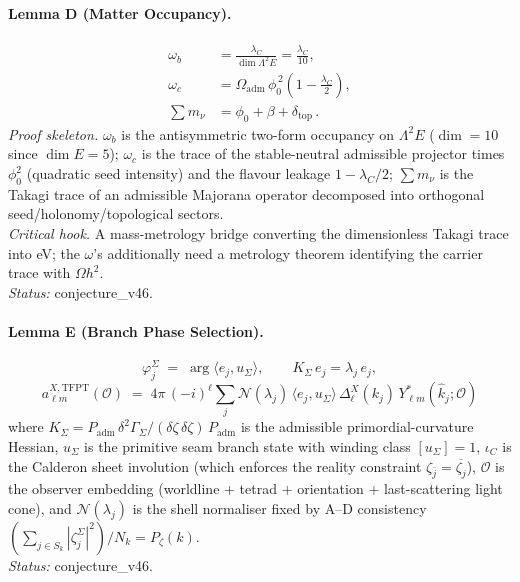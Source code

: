 \paragraph{Lemma D (Matter Occupancy).}
\begin{align}
\omega_b &= \frac{\lambda_C}{\dim \Lambda^2 E} = \frac{\lambda_C}{10},
\nonumber\\
\omega_c &= \Omega_{\mathrm{adm}}\,\phi_0^{\,2}\!\left(1-\frac{\lambda_C}{2}\right),
\nonumber\\
\sum m_\nu &= \phi_0 + \beta + \delta_{\mathrm{top}} \,.
\label{eq:lemmaD}
\end{align}
\emph{Proof skeleton.} \(\omega_b\) is the antisymmetric two-form
occupancy on \(\Lambda^2 E\) (\(\dim=10\) since \(\dim E=5\));
\(\omega_c\) is the trace of the stable-neutral admissible projector
times \(\phi_0^2\) (quadratic seed intensity) and the flavour leakage
\(1-\lambda_C/2\); \(\sum m_\nu\) is the Takagi trace of an admissible
Majorana operator decomposed into orthogonal seed/holonomy/topological
sectors.\\
\emph{Critical hook.} A mass-metrology bridge converting the
dimensionless Takagi trace into eV; the \(\omega\)'s additionally need
a metrology theorem identifying the carrier trace with
\(\Omega h^2\).\\
\emph{Status:} \textsf{conjecture\_v46}.

\paragraph{Lemma E (Branch Phase Selection).}
\begin{equation}
\boxed{\;
\varphi_j^\Sigma \;=\; \arg\langle e_j,u_\Sigma\rangle, \qquad
K_\Sigma\,e_j = \lambda_j\,e_j ,
\;}
\label{eq:lemmaE_phase}
\end{equation}
\begin{equation}
\boxed{\;
a_{\ell m}^{X,\mathrm{TFPT}}(\mathcal O) \;=\;
4\pi\,(-i)^\ell\sum_j
\mathcal N(\lambda_j)\,
\langle e_j,u_\Sigma\rangle\,
\Delta_\ell^X(k_j)\,Y_{\ell m}^{*}(\hat k_j;\mathcal O)
\;}
\label{eq:lemmaE_alm}
\end{equation}
where \(K_\Sigma = P_{\mathrm{adm}}\,\delta^2\Gamma_\Sigma/(\delta\zeta\,\delta\zeta)\,P_{\mathrm{adm}}\) is the admissible primordial-curvature Hessian, \(u_\Sigma\) is the primitive seam branch state with winding class \([u_\Sigma]=1\), \(\iota_C\) is the Calderon sheet involution (which enforces the reality constraint
\(\zeta_{\bar j}=\overline{\zeta_j}\)), \(\mathcal O\) is the observer
embedding (worldline + tetrad + orientation + last-scattering light
cone), and \(\mathcal N(\lambda_j)\) is the shell normaliser fixed by
A--D consistency
\((\sum_{j\in S_k}|\zeta_j^\Sigma|^2)/N_k = P_\zeta(k)\).\\
\emph{Status:} \textsf{conjecture\_v46}.

